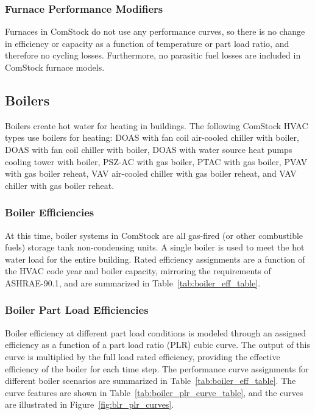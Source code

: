 \subsubsection{Furnace Performance Modifiers}

Furnaces in ComStock do not use any performance curves, so there is no change in efficiency or capacity as a function of temperature or part load ratio, and therefore no cycling losses. Furthermore, no parasitic fuel losses are included in ComStock furnace models.



\subsection{Boilers}

Boilers create hot water for heating in buildings. The following ComStock HVAC types use boilers for heating: DOAS with fan coil air-cooled chiller with boiler, DOAS with fan coil chiller with boiler, DOAS with water source heat pumps cooling tower with boiler, PSZ-AC with gas boiler, PTAC with gas boiler, PVAV with gas boiler reheat, VAV air-cooled chiller with gas boiler reheat, and VAV chiller with gas boiler reheat.

\subsubsection{Boiler Efficiencies}
At this time, boiler systems in ComStock are all gas-fired (or other combustible fuels) storage tank non-condensing units. A single boiler is used to meet the hot water load for the entire building. Rated efficiency assignments are a function of the HVAC code year and boiler capacity, mirroring the requirements of ASHRAE-90.1, and are summarized in Table~\ref{tab:boiler_eff_table}.

\subsubsection{Boiler Part Load Efficiencies}
Boiler efficiency at different part load conditions is modeled through an assigned efficiency as a function of a part load ratio (PLR) cubic curve. The output of this curve is multiplied by the full load rated efficiency, providing the effective efficiency of the boiler for each time step. The performance curve assignments for different boiler scenarios are summarized in Table~\ref{tab:boiler_eff_table}. The curve features are shown in Table~\ref{tab:boiler_plr_curve_table}, and the curves are illustrated in Figure~\ref{fig:blr_plr_curves}.

